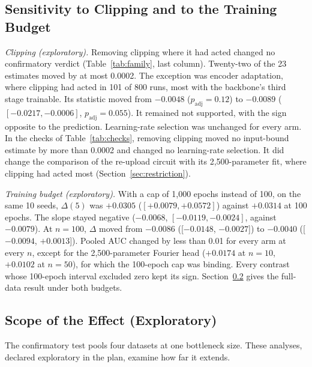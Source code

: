 \documentclass{ieeeaccess}
\begin{document}
\subsection{Sensitivity to Clipping and to the Training Budget}
\label{sec:sensitivity}
\emph{Clipping (exploratory).} Removing clipping where it had acted changed no confirmatory verdict (Table~\ref{tab:family}, last column). Twenty-two of the 23 estimates moved by at most 0.0002. The exception was encoder adaptation, where clipping had acted in 101 of 800 runs, most with the backbone's third stage trainable. Its statistic moved from $-0.0048$ ($p_{\mathrm{adj}}=0.12$) to $-0.0089$ ($[-0.0217,-0.0006]$, $p_{\mathrm{adj}}=0.055$). It remained not supported, with the sign opposite to the prediction. Learning-rate selection was unchanged for every arm. In the checks of Table~\ref{tab:checks}, removing clipping moved no input-bound estimate by more than 0.0002 and changed no learning-rate selection. It did change the comparison of the re-upload circuit with its 2,500-parameter fit, where clipping had acted most (Section~\ref{sec:restriction}).

\emph{Training budget (exploratory).} With a cap of 1,000 epochs instead of 100, on the same 10 seeds, $\Delta(5)$ was $+0.0305$ ($[+0.0079,+0.0572]$) against $+0.0314$ at 100 epochs. The slope stayed negative ($-0.0068$, $[-0.0119,-0.0024]$, against $-0.0079$). At $n=100$, $\Delta$ moved from $-0.0086$ ([$-0.0148$, $-0.0027$]) to $-0.0040$ ([$-0.0094$, $+0.0013$]). Pooled AUC changed by less than 0.01 for every arm at every $n$, except for the 2,500-parameter Fourier head ($+0.0174$ at $n=10$, $+0.0102$ at $n=50$), for which the 100-epoch cap was binding. Every contrast whose 100-epoch interval excluded zero kept its sign. Section~\ref{sec:scope} gives the full-data result under both budgets.

\subsection{Scope of the Effect (Exploratory)}
\label{sec:scope}
The confirmatory test pools four datasets at one bottleneck size. These analyses, declared exploratory in the plan, examine how far it extends.
\end{document}
